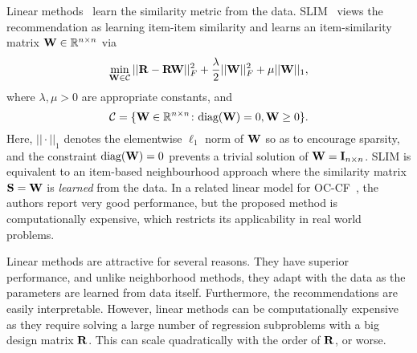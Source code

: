 Linear methods~\cite{Ning:2011, Sedhain:2016} learn the similarity metric from the data. SLIM~\citep{Ning:2011} views the recommendation as learning item-item similarity and learns an item-similarity matrix $\mathbf{W} \in \mathbb{R}^{n \times n}$ via
\begin{equation}
\label{eqn:slim}
\min_{ \mathbf{W} \in \mathcal{C} } || \mathbf{R} - \mathbf{R} \mathbf{W} ||_F^2 + \frac{\lambda}{2} || \mathbf{W} ||_F^2 + \mu || \mathbf{W} ||_1,
\end{equation}
where $\lambda, \mu > 0$ are appropriate constants, and
\begin{equation}
\label{eqn:slim-constraint}
\mathcal{C} = \{ \mathbf{W} \in \mathbb{R}^{n \times n} \colon \text{diag}( \mathbf{W} ) = 0, \mathbf{W} \geq 0 \}.
\end{equation}
Here, $|| \cdot ||_1$ denotes the elementwise $\ell_1$ norm of $\mathbf{W}$ so as to encourage sparsity, and the constraint $\text{diag}( \mathbf{W} ) = 0$ prevents a trivial solution of $\mathbf{W} = \mathbf{I}_{n \times n}$. SLIM is equivalent to an item-based neighbourhood approach where the similarity matrix $\mathbf{S} = \mathbf{W}$ is \emph{learned} from the data.
%
In a related linear model for OC-CF~\citep{Sedhain:2016}, the authors report very good performance, but the proposed method is computationally expensive, which restricts its applicability in real world problems.


Linear methods are attractive for several reasons. They have superior performance, and unlike neighborhood methods, they adapt with the data as the parameters are learned from data itself. Furthermore, the recommendations are easily interpretable. However, linear methods can be computationally expensive as they require solving a large number of regression subproblems with a big design matrix $\mathbf{R}$. This can scale quadratically with the order of $\mathbf{R}$, or worse.

